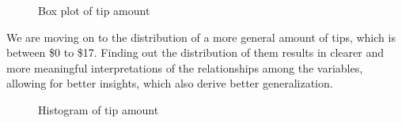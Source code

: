 \documentclass[11pt]{article}
\begin{document}
\begin{figure}[t]
    \centering
    \caption{Box plot of tip amount}
    \label{fig:foobar}
\end{figure}

We are moving on to the distribution of a more general amount of tips, which is between \$0 to \$17. Finding out the distribution of them results in clearer and more meaningful interpretations of the relationships among the variables, allowing for better insights, which also derive better generalization. 

\begin{figure}[t]
    \centering
    \caption{Histogram of tip amount}
    \label{fig:foobar}
\end{figure}
\end{document}
